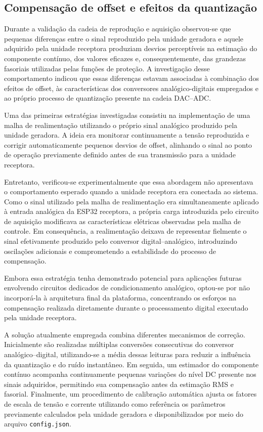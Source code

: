 \subsection{Compensação de offset e efeitos da quantização}

Durante a validação da cadeia de reprodução e aquisição observou-se que pequenas diferenças entre o sinal reproduzido pela unidade geradora e aquele adquirido pela unidade receptora produziam desvios perceptíveis na estimação do componente contínuo, dos valores eficazes e, consequentemente, das grandezas fasoriais utilizadas pelas funções de proteção. A investigação desse comportamento indicou que essas diferenças estavam associadas à combinação dos efeitos de offset, às características dos conversores analógico-digitais empregados e ao próprio processo de quantização presente na cadeia DAC--ADC.

Uma das primeiras estratégias investigadas consistiu na implementação de uma malha de realimentação utilizando o próprio sinal analógico produzido pela unidade geradora. A ideia era monitorar continuamente a tensão reproduzida e corrigir automaticamente pequenos desvios de offset, alinhando o sinal ao ponto de operação previamente definido antes de sua transmissão para a unidade receptora.

Entretanto, verificou-se experimentalmente que essa abordagem não apresentava o comportamento esperado quando a unidade receptora era conectada ao sistema. Como o sinal utilizado pela malha de realimentação era simultaneamente aplicado à entrada analógica da ESP32 receptora, a própria carga introduzida pelo circuito de aquisição modificava as características elétricas observadas pela malha de controle. Em consequência, a realimentação deixava de representar fielmente o sinal efetivamente produzido pelo conversor digital--analógico, introduzindo oscilações adicionais e comprometendo a estabilidade do processo de compensação.

Embora essa estratégia tenha demonstrado potencial para aplicações futuras envolvendo circuitos dedicados de condicionamento analógico, optou-se por não incorporá-la à arquitetura final da plataforma, concentrando os esforços na compensação realizada diretamente durante o processamento digital executado pela unidade receptora.

A solução atualmente empregada combina diferentes mecanismos de correção. Inicialmente são realizadas múltiplas conversões consecutivas do conversor analógico--digital, utilizando-se a média dessas leituras para reduzir a influência da quantização e do ruído instantâneo. Em seguida, um estimador do componente contínuo acompanha continuamente pequenas variações do nível DC presente nos sinais adquiridos, permitindo sua compensação antes da estimação RMS e fasorial. Finalmente, um procedimento de calibração automática ajusta os fatores de escala de tensão e corrente utilizando como referência os parâmetros previamente calculados pela unidade geradora e disponibilizados por meio do arquivo \texttt{config.json}.

